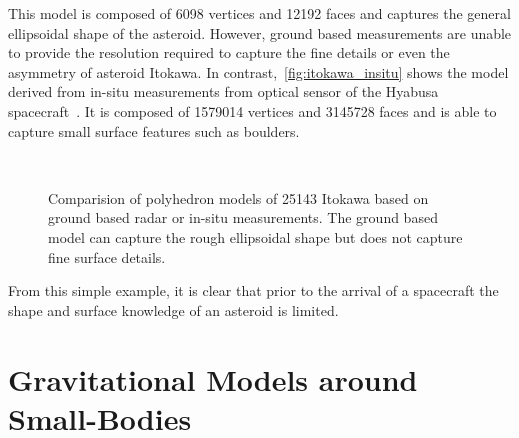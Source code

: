 This model is composed of \num{6098} vertices and \num{12192} faces and captures the general ellipsoidal shape of the asteroid.
However, ground based measurements are unable to provide the resolution required to capture the fine details or even the asymmetry of asteroid Itokawa.
In contrast,~\cref{fig:itokawa_insitu} shows the model derived from in-situ measurements from optical sensor of the Hyabusa spacecraft~\cite{gaskell2008a}.
It is composed of \num{1579014} vertices and \num{3145728} faces and is able to capture small surface features such as boulders.
\begin{figure}
    \centering
    ~
    \caption[Comparison of Radar and In-situ Itokawa models]{Comparision of polyhedron models of 25143 Itokawa based on ground based radar or in-situ measurements.
        The ground based model can capture the rough ellipsoidal shape but does not capture fine surface details.}
\end{figure}
From this simple example, it is clear that prior to the arrival of a spacecraft the shape and surface knowledge of an asteroid is limited.

\section{Gravitational Models around Small-Bodies}

